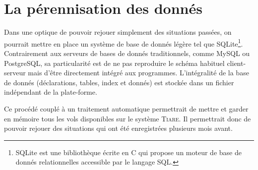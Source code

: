 \section{La pérennisation des donnés}
Dans une optique de pouvoir rejouer simplement des situations passées, on pourrait mettre en place un système de base de donnés légère tel que SQLite\footnote{SQLite est une bibliothèque écrite en C qui propose un moteur de base de donnés relationnelles accessible par le langage SQL.}. Contrairement aux serveurs de bases de donnés traditionnels, comme MySQL ou PostgreSQL, sa particularité est de ne pas reproduire le schéma habituel client-serveur mais d'être directement intégré aux programmes. L'intégralité de la base de donnés (déclarations, tables, index et donnés) est stockée dans un fichier indépendant de la plate-forme.

Ce procédé couplé à un traitement automatique permettrait de mettre et garder en mémoire tous les vols disponibles sur le système \textsc{Tiare}. Il permettrait donc de pouvoir rejouer des situations qui ont été enregistrées plusieurs mois avant. 




